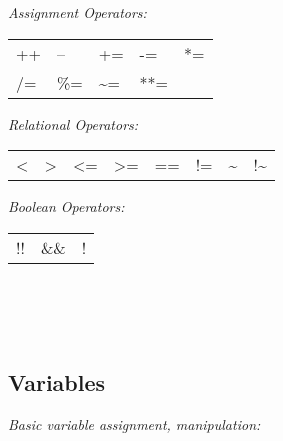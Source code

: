 \textit{Assignment Operators:}\\
\begin{tabular}{l l l l l}
    ++	&
    --	&
    +=	&
    -=	&
    *=	\\
    /=	&
    \%=	&
    \textasciitilde =	&
    **=	&
\end{tabular}



\textit{Relational Operators:}\\
\begin{tabular}{l l l l l l l l}
  < 	&
    >	&
    <=	&
    >=	&
    ==	&
    !=	&
    \textasciitilde	&
    !\textasciitilde	\\
\end{tabular}



\textit{Boolean Operators:}\\
\begin{tabular}{l l l}
    !!	&
    \&\&	&
    !	\\
\end{tabular} \\
\vspace{2mm}
\\
\\




\subsection*{Variables}

\textit{Basic variable  assignment, manipulation:}\\
\\
\\
\\
\\

